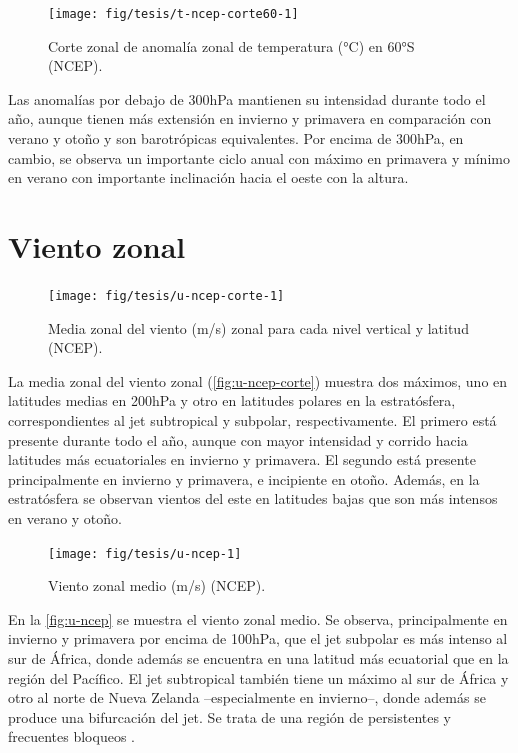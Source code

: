 \documentclass[spanish,a4paper,12pt,oneside]{book}
\begin{document}
\begin{figure}
\texttt{[image: fig/tesis/t-ncep-corte60-1]} \caption{Corte zonal de anomalía zonal de temperatura (°C) en 60°S (NCEP).}\label{fig:t-ncep-corte60}
\end{figure}

Las anomalías por debajo de 300hPa mantienen su intensidad durante todo
el año, aunque tienen más extensión en invierno y primavera en
comparación con verano y otoño y son barotrópicas equivalentes. Por
encima de 300hPa, en cambio, se observa un importante ciclo anual con
máximo en primavera y mínimo en verano con importante inclinación hacia
el oeste con la altura.

\section{Viento zonal}\label{viento-zonal}

\begin{figure}
\texttt{[image: fig/tesis/u-ncep-corte-1]} \caption{Media zonal del viento (m/s) zonal para cada nivel vertical y latitud (NCEP).}\label{fig:u-ncep-corte}
\end{figure}

La media zonal del viento zonal (\autoref{fig:u-ncep-corte}) muestra dos
máximos, uno en latitudes medias en 200hPa y otro en latitudes polares
en la estratósfera, correspondientes al jet subtropical y subpolar,
respectivamente. El primero está presente durante todo el año, aunque
con mayor intensidad y corrido hacia latitudes más ecuatoriales en
invierno y primavera. El segundo está presente principalmente en
invierno y primavera, e incipiente en otoño. Además, en la estratósfera
se observan vientos del este en latitudes bajas que son más intensos en
verano y otoño.

\begin{landscape}\begin{figure}

{\centering \texttt{[image: fig/tesis/u-ncep-1]} 

}

\caption{Viento zonal medio (m/s) (NCEP).}\label{fig:u-ncep}
\end{figure}
\end{landscape}

En la \autoref{fig:u-ncep} se muestra el viento zonal medio. Se observa,
principalmente en invierno y primavera por encima de 100hPa, que el jet
subpolar es más intenso al sur de África, donde además se encuentra en
una latitud más ecuatorial que en la región del Pacífico. El jet
subtropical también tiene un máximo al sur de África y otro al norte de
Nueva Zelanda --especialmente en invierno--, donde además se produce una
bifurcación del jet. Se trata de una región de persistentes y frecuentes
bloqueos \citep[ej.][]{Trenberth1985}.
\end{document}
